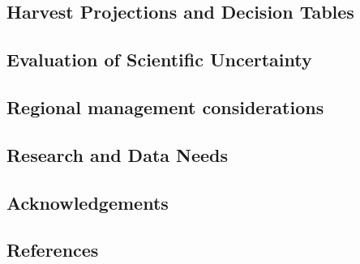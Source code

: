 \documentclass[
]{scrartcl}
\begin{document}
\subsection{Harvest Projections and Decision
Tables}\label{harvest-projections-and-decision-tables}

\subsection{Evaluation of Scientific
Uncertainty}\label{evaluation-of-scientific-uncertainty}

\subsection{Regional management
considerations}\label{regional-management-considerations}

\subsection{Research and Data Needs}\label{research-and-data-needs-1}

\newpage{}

\subsection{Acknowledgements}\label{sec-acknowledgements}

\newpage{}

\subsection{References}\label{references}
\end{document}

